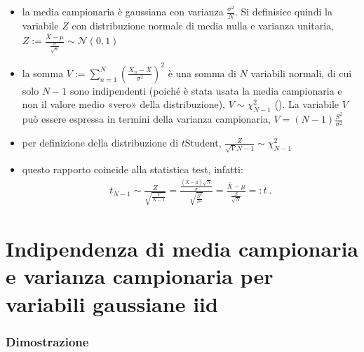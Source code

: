 \documentclass[letterpaper,10pt,italian]{jupyterBook}
\begin{document}
\begin{itemize}
\item {} 
\sphinxAtStartPar
la media campionaria è gaussiana con varianza \(\frac{\sigma^2}{N}\). Si definisice quindi la variabile \(Z\) con distribuzione normale di media nulla e varianza unitaria, \(Z := \frac{\bar{X} - \mu}{\frac{\sigma}{\sqrt{n}}} \sim \mathscr{N}(0,1)\)

\item {} 
\sphinxAtStartPar
la somma \(V := \sum_{n=1}^N \left(\frac{X_n - \bar{X}}{\sigma^2}\right)^2\) è una somma di \(N\) variabili normali, di cui solo \(N-1\) sono indipendenti (poiché è stata usata la media campionaria e non il valore medio «vero» della distribuzione), \(V \sim \chi^2_{N-1}\) ({\hyperref[\detokenize{ch/proofs:proof-s2-chi2-gauss}]{}}). La variabile \(V\) può essere espressa in termini della varianza campionaria, \(V = (N-1) \frac{S^2}{\sigma^2}\)

\item {} 
\sphinxAtStartPar
per definizione della distribuzione di \(t\)\sphinxhyphen{}Student, \(\frac{Z}{\sqrt{V}{N-1}} \sim \chi^2_{N-1}\)

\item {} 
\sphinxAtStartPar
questo rapporto coincide alla statistica test, infatti:
\begin{equation*}
\begin{split}t_{N-1} \sim \frac{Z}{\sqrt{\frac{V}{N-1}}} = \frac{\frac{(\bar{X}-\mu)\sqrt{N}}{\sigma}}{\sqrt{\frac{S^2}{\sigma^2}}} = \frac{\bar{X} - \mu}{\frac{S}{\sqrt{N}}} =: t \ .\end{split}
\end{equation*}
\end{itemize}


\section{Indipendenza di media campionaria e varianza campionaria per variabili gaussiane iid}
\label{\detokenize{ch/proofs:indipendenza-di-media-campionaria-e-varianza-campionaria-per-variabili-gaussiane-iid}}\label{\detokenize{ch/proofs:proof-independence-sample-estimators-norm}}\subsubsection*{Dimostrazione}

\sphinxAtStartPar
{}
\end{document}
